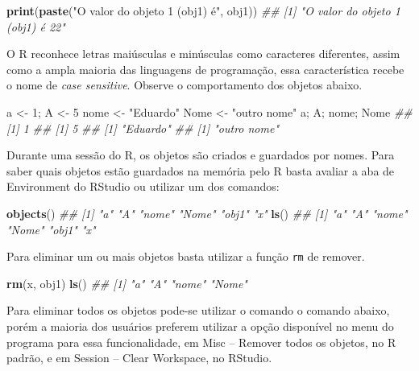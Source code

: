 \documentclass[
  11pt,
  a5paper,
  openany]{book}
\newenvironment{Shaded}{\begin{snugshade}}{\end{snugshade}}
\newcommand{\CommentTok}[1]{\textcolor[rgb]{0.56,0.35,0.01}{\textit{#1}}}
\newcommand{\DecValTok}[1]{\textcolor[rgb]{0.00,0.00,0.81}{#1}}
\newcommand{\KeywordTok}[1]{\textcolor[rgb]{0.13,0.29,0.53}{\textbf{#1}}}
\newcommand{\NormalTok}[1]{#1}
\newcommand{\StringTok}[1]{\textcolor[rgb]{0.31,0.60,0.02}{#1}}
\begin{document}
\begin{Shaded}
\begin{Highlighting}[]
\KeywordTok{print}\NormalTok{(}\KeywordTok{paste}\NormalTok{(}\StringTok{"O valor do objeto 1 (obj1) é"}\NormalTok{, obj1))}
\CommentTok{## [1] "O valor do objeto 1 (obj1) é 22"}
\end{Highlighting}
\end{Shaded}

O R reconhece letras maiúsculas e minúsculas como caracteres diferentes, assim como a ampla maioria das linguagens de programação, essa característica recebe o nome de \emph{case sensitive}. Observe o comportamento dos objetos abaixo.

\begin{Shaded}
\begin{Highlighting}[]
\NormalTok{a <-}\StringTok{ }\DecValTok{1}\NormalTok{; A <-}\StringTok{ }\DecValTok{5}
\NormalTok{nome <-}\StringTok{ "Eduardo"}
\NormalTok{Nome <-}\StringTok{ "outro nome"}
\NormalTok{a; A; nome; Nome}
\CommentTok{## [1] 1}
\CommentTok{## [1] 5}
\CommentTok{## [1] "Eduardo"}
\CommentTok{## [1] "outro nome"}
\end{Highlighting}
\end{Shaded}

Durante uma sessão do R, os objetos são criados e guardados por nomes. Para saber quais objetos estão guardados na memória pelo R basta avaliar a aba de Environment do RStudio ou utilizar um dos comandos:

\begin{Shaded}
\begin{Highlighting}[]
\KeywordTok{objects}\NormalTok{()}
\CommentTok{## [1] "a" "A" "nome" "Nome" "obj1" "x"   }
\KeywordTok{ls}\NormalTok{()}
\CommentTok{## [1] "a" "A" "nome" "Nome" "obj1" "x"   }
\end{Highlighting}
\end{Shaded}

Para eliminar um ou mais objetos basta utilizar a função \texttt{rm} de remover.

\begin{Shaded}
\begin{Highlighting}[]
\KeywordTok{rm}\NormalTok{(x, obj1)}
\KeywordTok{ls}\NormalTok{()}
\CommentTok{## [1] "a" "A" "nome" "Nome"}
\end{Highlighting}
\end{Shaded}

Para eliminar todos os objetos pode-se utilizar o comando o comando abaixo, porém a maioria dos usuários preferem utilizar a opção disponível no menu do programa para essa funcionalidade, em Misc -- Remover todos os objetos, no R padrão, e em Session -- Clear Workspace, no RStudio.
\end{document}
